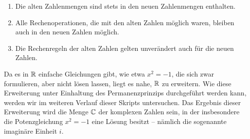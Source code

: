 \documentclass[a4paper, 11pt]{article}
\begin{document}
\begin{enumerate}
\item Die alten Zahlenmengen sind stets in den neuen Zahlenmengen enthalten.
\item Alle Rechenoperationen, die mit den alten Zahlen möglich waren, bleiben auch in den neuen Zahlen möglich.
\item Die Rechenregeln der alten Zahlen gelten unverändert auch für die neuen Zahlen.
\end{enumerate}

Da es in $\mathbb{R}$ einfache Gleichungen gibt, wie etwa $x^2 = -1$, die sich zwar formulieren, aber nicht lösen lassen, liegt es nahe, $\mathbb{R}$ zu erweitern. Wie diese Erweiterung unter Einhaltung des Permanenzprinzips durchgeführt werden kann, werden wir im weiteren Verlauf dieser Skripts untersuchen. Das Ergebnis dieser Erweiterung wird die Menge $\mathbb{C}$ der komplexen Zahlen sein, in der insbesondere die Potenzgleichung $x^2 = -1$ eine Lösung besitzt – nämlich die sogenannte imaginäre Einheit $i$.

\clearpage

\clearpage

\clearpage

\clearpage

%


	
\end{document}
